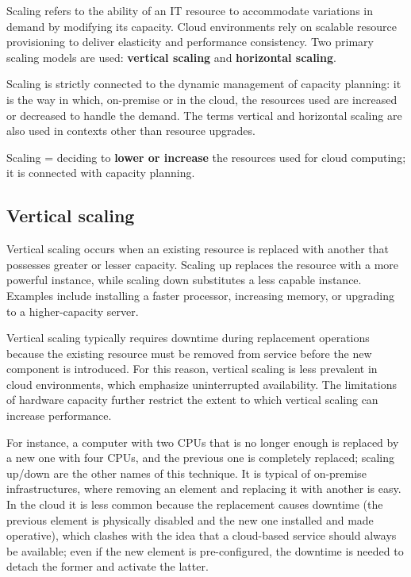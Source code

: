 Scaling refers to the ability of an IT resource to accommodate variations in demand by modifying its capacity. Cloud environments rely on scalable resource provisioning to deliver elasticity and performance consistency. Two primary scaling models are used: \textbf{vertical scaling} and \textbf{horizontal scaling}.

Scaling is strictly connected to the dynamic management of capacity planning: it is the way in which, on-premise or in the cloud, the resources used are increased or decreased to handle the demand. The terms vertical and horizontal scaling are also used in contexts other than resource upgrades.

\begin{notebox}
	Scaling = deciding to \textbf{lower or increase} the resources used for cloud computing; it is connected with capacity planning.
\end{notebox}

\subsection{Vertical scaling}

Vertical scaling occurs when an existing resource is replaced with another that possesses greater or lesser capacity. Scaling up replaces the resource with a more powerful instance, while scaling down substitutes a less capable instance. Examples include installing a faster processor, increasing memory, or upgrading to a higher-capacity server.

\begin{center}
\end{center}

Vertical scaling typically requires downtime during replacement operations because the existing resource must be removed from service before the new component is introduced. For this reason, vertical scaling is less prevalent in cloud environments, which emphasize uninterrupted availability. The limitations of hardware capacity further restrict the extent to which vertical scaling can increase performance.

For instance, a computer with two CPUs that is no longer enough is replaced by a new one with four CPUs, and the previous one is completely replaced; scaling up/down are the other names of this technique. It is typical of on-premise infrastructures, where removing an element and replacing it with another is easy. In the cloud it is less common because the replacement causes downtime (the previous element is physically disabled and the new one installed and made operative), which clashes with the idea that a cloud-based service should always be available; even if the new element is pre-configured, the downtime is needed to detach the former and activate the latter.

